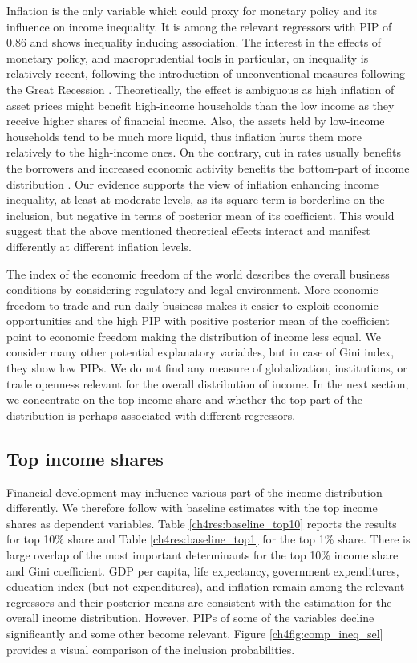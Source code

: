 \documentclass[preprint, nonatbib, 10pt]{elsarticle}
\begin{document}
Inflation is the only variable which could proxy for monetary policy and its influence on income inequality. It is among the relevant regressors with \ac{PIP} of 0.86 and shows inequality inducing association. The interest in the effects of monetary policy, and macroprudential tools in particular, on inequality is relatively recent, following the introduction of unconventional measures following the Great Recession \parencite{frost2018macroprudential}. Theoretically, the effect is ambiguous as high inflation of asset prices might benefit high-income households than the low income as they receive higher shares of financial income. Also, the assets held by low-income households tend to be much more liquid, thus inflation hurts them more relatively to the high-income ones. On the contrary, cut in rates usually benefits the borrowers and increased economic activity benefits the bottom-part of income distribution \parencite{furceri2019robust}. Our evidence supports the view of inflation enhancing income inequality, at least at moderate levels, as its square term is borderline on the inclusion, but negative in terms of posterior mean of its coefficient. This would suggest that the above mentioned theoretical effects interact and manifest differently at different inflation levels.

The index of the economic freedom of the world describes the overall business conditions by considering regulatory and legal environment. More economic freedom to trade and run daily business makes it easier to exploit economic opportunities and the high \ac{PIP} with positive posterior mean of the coefficient point to economic freedom making the distribution of income less equal. We consider many other potential explanatory variables, but in case of Gini index, they show low \acp{PIP}. We do not find any measure of globalization, institutions, or trade openness relevant for the overall distribution of income. In the next section, we concentrate on the top income share and whether the top part of the distribution is perhaps associated with different regressors.

\subsection{Top income shares}
Financial development may influence various part of the income distribution differently. We therefore follow with baseline estimates with the top income shares as dependent variables. Table \ref{ch4res:baseline_top10} reports the results for top 10\% share and Table \ref{ch4res:baseline_top1} for the top 1\% share. There is large overlap of the most important determinants for the top 10\% income share and Gini coefficient. GDP per capita, life expectancy, government expenditures, education index (but not expenditures), and inflation remain among the relevant regressors and their posterior means are consistent with the estimation for the overall income distribution. However, \acp{PIP} of some of the variables decline significantly and some other become relevant. Figure \ref{ch4fig:comp_ineq_sel} provides a visual comparison of the inclusion probabilities.
\end{document}
